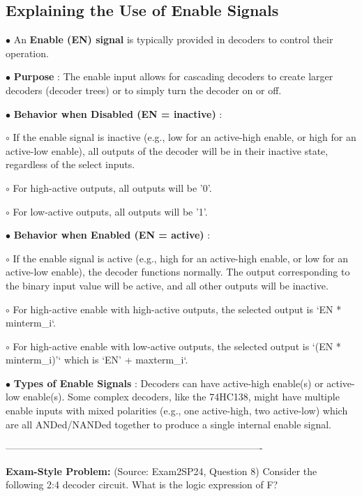 \documentclass{article}
\begin{document}
\begin{itemize}
\subsection{Explaining the Use of Enable Signals}

$\bullet$ An \textbf{Enable (EN) signal} is typically provided in decoders to control their operation.

$\bullet$ \textbf{Purpose} : The enable input allows for cascading decoders to create larger decoders (decoder trees) or to simply turn the decoder on or off.

$\bullet$ \textbf{Behavior when Disabled (EN = inactive)} :

    $\circ$ If the enable signal is inactive (e.g., low for an active-high enable, or high for an active-low enable), all outputs of the decoder will be in their inactive state, regardless of the select inputs.

    $\circ$ For high-active outputs, all outputs will be '0'.

    $\circ$ For low-active outputs, all outputs will be '1'.

$\bullet$ \textbf{Behavior when Enabled (EN = active)} :

    $\circ$ If the enable signal is active (e.g., high for an active-high enable, or low for an active-low enable), the decoder functions normally. The output corresponding to the binary input value will be active, and all other outputs will be inactive.

    $\circ$ For high-active enable with high-active outputs, the selected output is `EN * minterm\_i`.

    $\circ$ For high-active enable with low-active outputs, the selected output is `(EN * minterm\_i)'` which is `EN' + maxterm\_i`.

$\bullet$ \textbf{Types of Enable Signals} : Decoders can have active-high enable(s) or active-low enable(s). Some complex decoders, like the 74HC138, might have multiple enable inputs with mixed polarities (e.g., one active-high, two active-low) which are all ANDed/NANDed together to produce a single internal enable signal.

\-------------------------------------------------------------------------------- 

\textbf{Exam-Style Problem:} (Source: Exam2SP24, Question 8) Consider the following 2:4 decoder circuit. What is the logic expression of F?

\begin{center}


\end{center}
\end{itemize}
\end{document}
